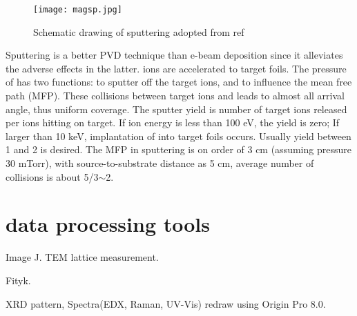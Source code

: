 \begin{figure}[htb]
\centering
\texttt{[image: magsp.jpg]}
\caption[magnetron sputtering system]{Schematic drawing of sputtering adopted from ref\cite{Song2008}}
\label{fig:ch2magsp}
\end{figure}

Sputtering is a better PVD technique than e-beam deposition since it alleviates the adverse effects in the latter.  ions are accelerated to target foils. The pressure of  has two functions: to sputter off the target ions, and to influence the mean free path (MFP). These collisions between target ions and  leads to almost all arrival angle, thus uniform coverage. The sputter yield is number of target ions released per ions hitting on target. If  ion energy is less than 100 eV, the yield is zero; If larger than 10 keV, implantation of  into target foils occurs. Usually yield between 1 and 2 is desired. The MFP in sputtering is on order of 3 cm (assuming pressure 30 mTorr), with source-to-substrate distance as 5 cm, average number of collisions is about 5/3$\sim$2. 


\section{data processing tools}

Image J.\cite{Schneider2012} TEM lattice measurement. 

Fityk. \cite{Wojdyr2010}

XRD pattern, Spectra(EDX, Raman, UV-Vis) redraw using Origin Pro 8.0. 















